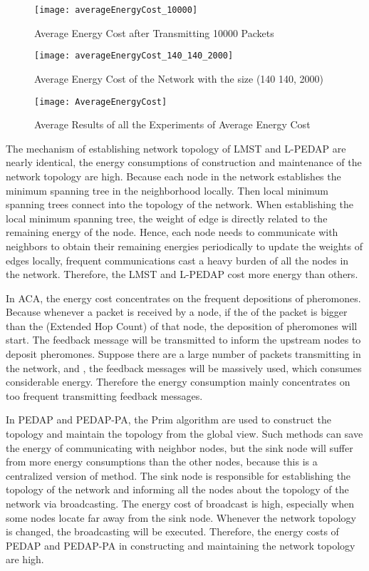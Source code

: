 \documentclass{elsarticle}
\begin{document}
\begin{figure}
\centering
  \texttt{[image: averageEnergyCost\_10000]}
  \caption{Average Energy Cost after Transmitting 10000 Packets} \label{figure1}
\end{figure}

\begin{figure}
\centering
  \texttt{[image: averageEnergyCost\_140\_140\_2000]}
  \caption{Average Energy Cost of the Network with the size (140  140, 2000)} \label{figure2}
\end{figure}

\begin{figure}
\centering
  \texttt{[image: AverageEnergyCost]}
  \caption{Average Results of all the Experiments of Average Energy Cost} \label{figure3}
\end{figure}

The mechanism of establishing network topology of LMST and L-PEDAP are nearly identical, the energy consumptions of construction and maintenance of the network topology are high. Because each node in the network establishes the minimum spanning tree in the neighborhood locally. Then local minimum spanning trees connect into the topology of the network. When establishing the local minimum spanning tree, the weight of edge is directly related to the remaining energy of the node.  Hence, each node needs to communicate with neighbors to obtain their remaining energies periodically to update the weights of edges locally, frequent communications cast a heavy burden of all the nodes in the network. Therefore, the LMST and L-PEDAP cost more energy than others.

In ACA, the energy cost concentrates on the frequent depositions of pheromones. Because whenever a packet is received by a node, if the  of the packet is bigger than the (Extended Hop Count)\cite{label-10} of that node, the deposition of pheromones will start. The feedback message will be transmitted to inform the upstream nodes to deposit pheromones. Suppose there are a large number of packets transmitting in the network, and , the feedback messages will be massively used, which consumes considerable energy. Therefore the energy consumption mainly concentrates on too frequent transmitting feedback messages.

In PEDAP and PEDAP-PA, the Prim algorithm are used to construct the topology and maintain the topology from the global view. Such methods can save the energy of communicating with neighbor nodes, but the sink node will suffer from more energy consumptions than the other nodes, because this is a centralized version of method. The sink node is responsible for establishing the topology of the network and informing all the nodes about the topology of the network via broadcasting. The energy cost of broadcast is high, especially when some nodes locate far away from the sink node. Whenever the network topology is changed, the broadcasting will be executed. Therefore, the energy costs of PEDAP and PEDAP-PA in constructing and maintaining the network topology are high.
\end{document}
